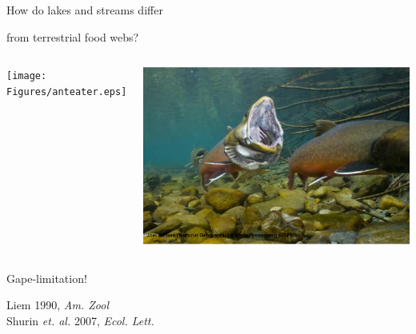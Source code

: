 \documentclass{beamer}
\begin{document}
  \begin{frame}{How do lakes and streams differ}
    \begin{block}{from terrestrial food webs?}

      \begin{columns}
        \column{.5in}
      
        \column{1.9in}
          \begin{center}
          \texttt{[image: Figures/anteater.eps]}
          \end{center}
        \column{.2in}
        \column{1.9in}
          \begin{center}
          \includegraphics[width=.8\textwidth]{Figures/trout.eps}
          \end{center}
        \column{.5in}
      \end{columns}

        \vspace{.5cm}

      \begin{columns}
        \column{.5in}
      
        \column{1.9in}

         \begin{center}
        
        Gape-limitation!

        \vspace{.25cm}

        {\tiny Liem 1990, \emph{Am. Zool}}\\
        {\tiny Shurin \emph{et. al.} 2007, \emph{Ecol. Lett.}}
        \end{center}

        \column{.2in}

        \column{1.9in}


\end{columns}
\end{block}
\end{frame}
\end{document}
